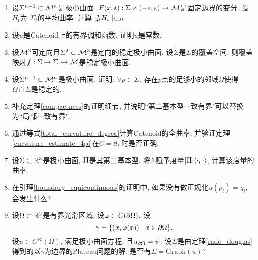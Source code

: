 \begin{enumerate}
    \item 设$\Sigma^{n-1} \subset \M^n$是极小曲面. $F(x,t): \Sigma \times (-\epsilon, \epsilon)\to \M$是固定边界的变分. 设$H_t$为 $\Sigma_t$的平均曲率. 计算 $\ddt H_t \mid _{t=0}$.
    \item 设$u$是Catenoid上的有界调和函数, 证明$u$是常数.
    \item 设$\M^3$可定向且$\Sigma^2 \subset \M^3$是定向的稳定极小曲面. 设$\tilde{\Sigma}$是$\Sigma$的覆盖空间. 则覆盖映射$f:\tilde{\Sigma}\to \Sigma \hookrightarrow \M$是稳定极小曲面.
    \item 设$\Sigma^{n-1} \subset \M^n$是极小曲面. 证明: $\forall p \in \Sigma$, 存在$p$点的足够小的邻域$\Omega$使得$\Omega \cap \Sigma$是稳定的.
    \item 补充定理\eqref{compactness}的证明细节, 并说明``第二基本型一致有界"可以替换为``局部一致有界".
    \item 通过等式\eqref{total_curvature_degree}计算Catenoid的全曲率, 并验证定理\eqref{curvature_estimate_4pi}在$C=8\pi$时是否正确.
    \item 设$\Sigma \subset \R^3$是极小曲面, $\II$是其第二基本型. 将$\Sigma$赋予度量$\abs{\II}\inner{\cdot}{\cdot}$, 计算该度量的曲率.
    \item 在引理\eqref{boundary_equicontinuous}的证明中, 如果没有做正规化$u(p_i)=q_i$, 会发生什么?
    \item 设$\Omega \subset \R^2$是有界光滑区域. 设$\phi\in C(\P \Omega)$,  设
    \begin{equation}
        \gamma=\{(x,\phi(x))\mid x \in \P \Omega\}.  
    \end{equation}
    设$u\in C^\infty(\Omega)$, 满足极小曲面方程, 且$u_{\P \Omega}=\psi$.  设$\Sigma$是由定理\eqref{rado_douglas}得到的以$\gamma$为边界的Plateau问题的解. 是否有$\Sigma=\text{Graph}(u)$?
\end{enumerate}